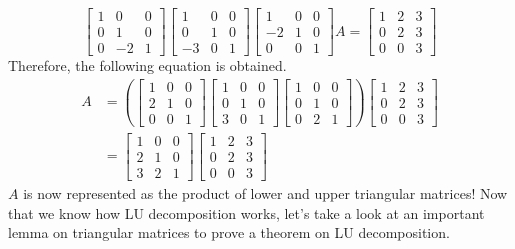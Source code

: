 \documentclass[../../../main.tex]{subfiles}
\begin{document}
\[
\begin{bmatrix}
    1 & 0  & 0 \\
    0 & 1  & 0 \\
    0 & -2 & 1
\end{bmatrix}
\begin{bmatrix}
    1  & 0 & 0 \\
    0  & 1 & 0 \\
    -3 & 0 & 1
\end{bmatrix}
\begin{bmatrix}
    1  & 0 & 0 \\
    -2 & 1 & 0 \\
    0  & 0 & 1
\end{bmatrix}
A
=
\begin{bmatrix}
    1 & 2 & 3 \\
    0 & 2 & 3 \\
    0 & 0 & 3
\end{bmatrix}
\]
Therefore, the following equation is obtained.
\begin{align*}
    A
    &=
    \left(
    \begin{bmatrix}
        1 & 0 & 0 \\
        2 & 1 & 0 \\
        0 & 0 & 1
    \end{bmatrix}
    \begin{bmatrix}
        1 & 0 & 0 \\
        0 & 1 & 0 \\
        3 & 0 & 1
    \end{bmatrix}
    \begin{bmatrix}
        1 & 0 & 0 \\
        0 & 1 & 0 \\
        0 & 2 & 1
    \end{bmatrix}
    \right)
    \begin{bmatrix}
        1 & 2 & 3 \\
        0 & 2 & 3 \\
        0 & 0 & 3
    \end{bmatrix} \\
    &=
    \begin{bmatrix}
        1 & 0 & 0 \\
        2 & 1 & 0 \\
        3 & 2 & 1
    \end{bmatrix}
    \begin{bmatrix}
        1 & 2 & 3 \\
        0 & 2 & 3 \\
        0 & 0 & 3
    \end{bmatrix}
\end{align*}
$A$ is now represented as the product of lower and upper triangular
matrices! Now that we know how LU decomposition works, let's take
a look at an important lemma on triangular matrices to prove a
theorem on LU decomposition.
\end{document}
